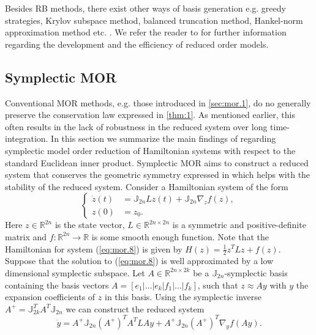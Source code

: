 Besides RB methods, there exist other ways of basis generation e.g. greedy strategies, Krylov subspace method, balanced truncation method, Hankel-norm approximation method etc. \cite{antoulas2005approximation}. We refer the reader to \cite{hesthaven2015certified,quarteroni2015reduced,Haasdonk2017} for further information regarding the development and the efficiency of reduced order models. 

\subsection{Symplectic MOR} \label{sec:mor.2}
Conventional MOR methods, e.g. those introduced in \cref{sec:mor.1}, do no generally preserve the conservation law expressed in \cref{thm:1}. As mentioned earlier, this often results in the lack of robustness in the reduced system over long time-integration. In this section we summarize the main findings of \cite{doi:10.1137/17M1111991} regarding symplectic model order reduction of Hamiltonian systems with respect to the standard Euclidean inner product. Symplectic MOR aims to construct a reduced system that conserves the geometric symmetry expressed in  which helps with the stability of the reduced system.
Consider a Hamiltonian system of the form
\begin{equation} \label{eq:mor.8}
\left\{
\begin{aligned}
	\dot z(t) &= \mathbb J_{2n} L z(t) + \mathbb J_{2n} \nabla_z f(z), \\
	z(0) &= z_0.
\end{aligned}
\right.
\end{equation}
Here $z\in \mathbb R^{2n}$ is the state vector, $L\in\mathbb R^{2n\times 2n}$ is a symmetric and positive-definite matrix and $f:\mathbb R^{2n}\to\mathbb R$ is some smooth enough function. Note that the Hamiltonian for system (\ref{eq:mor.8}) is given by $H(z) = \frac 1 2 z^TLz + f(z)$. Suppose that the solution to (\ref{eq:mor.8}) is well approximated by a low dimensional symplectic subspace. Let $A\in \mathbb{R}^{2n\times 2k}$ be a $\mathbb{J}_{2n}$-symplectic basis containing the basis vectors $A=[e_1|\dots|e_k|f_1|\dots|f_k]$, such that $z \approx Ay$ with $y$ the expansion coefficients of $z$ in this basis. Using the symplectic inverse $A^+ = \mathbb J_{2k}^T A^T \mathbb J_{2n}$ we can construct the reduced system
\begin{equation} \label{eq:mor.9}
	\dot y = A^+ \mathbb J_{2n} (A^+)^T A^T L A y + A^+ \mathbb J_{2n} (A^+)^T \nabla_y f(Ay).
\end{equation}
